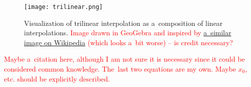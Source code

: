 			
			\begin{figure}[H]
				\centering
				\texttt{[image: trilinear.png]}
				\caption{Visualization of trilinear interpolation as a~composition of linear interpolations. \textcolor{red}{Image drawn in GeoGebra and inspired by \href{https://commons.wikimedia.org/wiki/File:3D_interpolation2.svg}{a~similar image on Wikipedia} (which looks a~bit worse) -- is credit necessary?}}
				\label{fig:trilin}
			\end{figure}
			
			\textcolor{red}{Maybe a~citation here, although I am not sure it is necessary since it could be considered common knowledge. The~last two equations are my own. Maybe $x_0$, etc. should be explicitly described.}